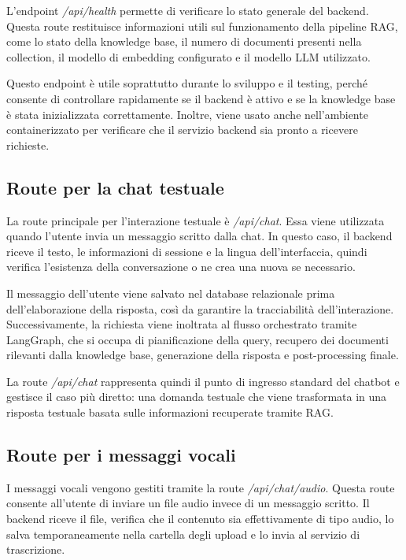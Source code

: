 L’endpoint \textit{/api/health} permette di verificare lo stato generale del backend. Questa route restituisce informazioni utili sul funzionamento della pipeline RAG, come lo stato della knowledge base, il numero di documenti presenti nella collection, il modello di embedding configurato e il modello LLM utilizzato.

Questo endpoint è utile soprattutto durante lo sviluppo e il testing, perché consente di controllare rapidamente se il backend è attivo e se la knowledge base è stata inizializzata correttamente. Inoltre, viene usato anche nell’ambiente containerizzato per verificare che il servizio backend sia pronto a ricevere richieste.

\subsection*{Route per la chat testuale}

La route principale per l’interazione testuale è \textit{/api/chat}. Essa viene utilizzata quando l’utente invia un messaggio scritto dalla chat. In questo caso, il backend riceve il testo, le informazioni di sessione e la lingua dell’interfaccia, quindi verifica l’esistenza della conversazione o ne crea una nuova se necessario.

Il messaggio dell’utente viene salvato nel database relazionale prima dell’elaborazione della risposta, così da garantire la tracciabilità dell’interazione. Successivamente, la richiesta viene inoltrata al flusso orchestrato tramite LangGraph, che si occupa di pianificazione della query, recupero dei documenti rilevanti dalla knowledge base, generazione della risposta e post-processing finale.

La route \textit{/api/chat} rappresenta quindi il punto di ingresso standard del chatbot e gestisce il caso più diretto: una domanda testuale che viene trasformata in una risposta testuale basata sulle informazioni recuperate tramite RAG.

\subsection*{Route per i messaggi vocali}

I messaggi vocali vengono gestiti tramite la route \textit{/api/chat/audio}. Questa route consente all’utente di inviare un file audio invece di un messaggio scritto. Il backend riceve il file, verifica che il contenuto sia effettivamente di tipo audio, lo salva temporaneamente nella cartella degli upload e lo invia al servizio di trascrizione.

